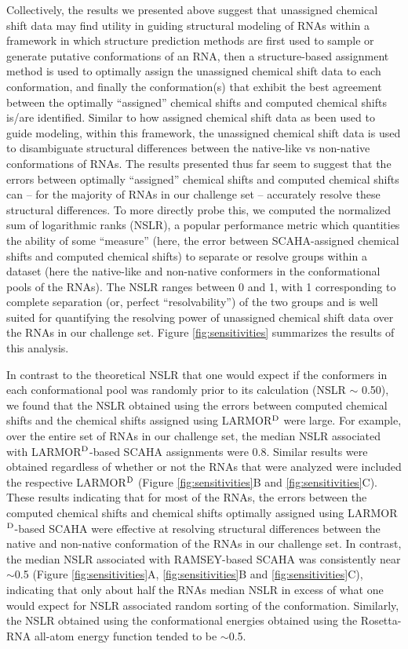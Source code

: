 \documentclass[journal=jcisd8,manuscript=article,layout=onecolumn]{achemso}
\begin{document}
Collectively, the results we presented above suggest that unassigned chemical shift data may find utility in guiding structural modeling of RNAs within a framework in which structure prediction methods are first used to sample or generate putative conformations of an RNA, then a structure-based assignment method is used to optimally assign the unassigned chemical shift data to each conformation, and finally the conformation(s) that exhibit the best agreement between the optimally ``assigned'' chemical shifts and computed chemical shifts is/are identified. Similar to how assigned chemical shift data as been used to guide modeling\cite{sripakdeevong2014structure}, within this framework, the unassigned chemical shift data is used to disambiguate  structural differences between the native-like vs non-native conformations of RNAs. The results presented thus far seem to suggest that the errors between optimally ``assigned'' chemical shifts and computed chemical shifts can -- for the majority of RNAs in our challenge set -- accurately resolve these structural differences. To more directly probe this, we computed the normalized sum of logarithmic ranks (NSLR)\cite{venkatraman2010comprehensive}, a popular performance metric which quantities the ability of some ``measure''  (here, the error between SCAHA-assigned chemical shifts and computed chemical shifts) to separate or resolve groups within a dataset (here the native-like and non-native conformers in the conformational pools of the RNAs). The NSLR ranges between 0 and 1, with 1 corresponding to complete separation (or, perfect ``resolvability'') of the two groups and is well suited for quantifying the resolving power of unassigned chemical shift data over the RNAs in our challenge set\cite{frank2016can}. Figure \ref{fig:sensitivities} summarizes the results of this analysis.

In contrast to the theoretical NSLR that one would expect if the conformers in each conformational pool was randomly prior to its calculation (NSLR $\sim$ 0.50), we found that the NSLR obtained using the errors between computed chemical shifts and the chemical shifts assigned using LARMOR$^{\rm D}$ were large. For example, over the entire set of RNAs in our challenge set, the median NSLR associated with LARMOR$^{\rm D}$-based SCAHA assignments were 0.8. Similar results were obtained regardless of whether or not the RNAs that were analyzed were included the respective LARMOR$^{\rm D}$ (Figure \ref{fig:sensitivities}B and \ref{fig:sensitivities}C).  These results indicating that for most of the RNAs, the errors between the computed chemical shifts and  chemical shifts optimally assigned using LARMOR$^{\rm D}$-based SCAHA were effective at resolving structural differences between the native and non-native conformation of the RNAs in our challenge set.  In contrast, the median NSLR associated with RAMSEY-based SCAHA was consistently near $\sim$0.5 (Figure  \ref{fig:sensitivities}A, \ref{fig:sensitivities}B and \ref{fig:sensitivities}C), indicating that only about half the RNAs median NSLR in excess of what one would expect for NSLR associated random sorting of the conformation. Similarly, the NSLR obtained using the conformational energies obtained using the Rosetta-RNA all-atom energy function\cite{alford2017rosetta} tended to be $\sim$0.5.
\end{document}
